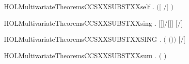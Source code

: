 \begin{SaveVerbatim}{HOLMultivariateTheoremsCCSXXSUBSTXXself}
\HOLTokenTurnstile{} \HOLSymConst{\HOLTokenForall{}} .   \HOLSymConst{\HOLTokenImp{}} \ensuremath{(}\ensuremath{[}  \ensuremath{/}\ensuremath{]}  \HOLSymConst{\ensuremath{=}} \ensuremath{)}
\end{SaveVerbatim}
\newcommand{\HOLMultivariateTheoremsCCSXXSUBSTXXself}{\UseVerbatim{HOLMultivariateTheoremsCCSXXSUBSTXXself}}
\begin{SaveVerbatim}{HOLMultivariateTheoremsCCSXXSUBSTXXsing}
\HOLTokenTurnstile{} \HOLSymConst{\HOLTokenForall{}}  . \ensuremath{[}\ensuremath{[}\ensuremath{]}\ensuremath{/}\ensuremath{[}\ensuremath{]}\ensuremath{]}  \HOLSymConst{\ensuremath{=}} \ensuremath{[}\ensuremath{/}\ensuremath{]} 
\end{SaveVerbatim}
\newcommand{\HOLMultivariateTheoremsCCSXXSUBSTXXsing}{\UseVerbatim{HOLMultivariateTheoremsCCSXXSUBSTXXsing}}
\begin{SaveVerbatim}{HOLMultivariateTheoremsCCSXXSUBSTXXSING}
\HOLTokenTurnstile{} \HOLSymConst{\HOLTokenForall{}}  .  \ensuremath{(} \HOLSymConst{|+} \ensuremath{(}\HOLSymConst{,}\ensuremath{)}\ensuremath{)}  \HOLSymConst{\ensuremath{=}} \ensuremath{[}\ensuremath{/}\ensuremath{]} 
\end{SaveVerbatim}
\newcommand{\HOLMultivariateTheoremsCCSXXSUBSTXXSING}{\UseVerbatim{HOLMultivariateTheoremsCCSXXSUBSTXXSING}}
\begin{SaveVerbatim}{HOLMultivariateTheoremsCCSXXSUBSTXXsum}
\HOLTokenTurnstile{} \HOLSymConst{\HOLTokenForall{}}  .
         \ensuremath{(} \HOLSymConst{\ensuremath{+}} \ensuremath{)} \HOLSymConst{\ensuremath{=}}
          \HOLSymConst{\ensuremath{+}}   
\end{SaveVerbatim}
